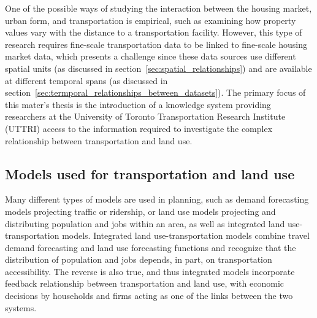 One of the possible ways of studying the interaction between the housing market, urban form, and transportation is empirical, such as examining how property values vary with the distance to a transportation facility\cite{Sherry1999}.
However, this type of research requires fine-scale transportation data to be linked to fine-scale housing market data, which presents a challenge since these data sources use different spatial units (as discussed in section~\ref{sec:spatial_relationships}) and are available at different temporal spans (as discussed in section~\ref{sec:termporal_relationships_between_datasets}).
The primary focus of this mater's thesis is the introduction of a knowledge system providing researchers at the University of Toronto Transportation Research Institute (UTTRI) access to the information required to investigate the complex relationship between transportation and land use.

\subsection{Models used for transportation and land use} \label{subsec:transportation_land_use_interaction}

Many different types of models are used in planning, such as demand forecasting models projecting traffic or ridership, or land use models projecting and distributing population and jobs within an area, as well as integrated land use-transportation models.
Integrated land use-transportation models combine travel demand forecasting and land use forecasting functions and recognize that the distribution of population and jobs depends, in part, on transportation accessibility.
The reverse is also true, and thus integrated models incorporate feedback relationship between transportation and land use, with economic decisions by households and firms acting as one of the links between the two systems\cite{Miller1999}.

